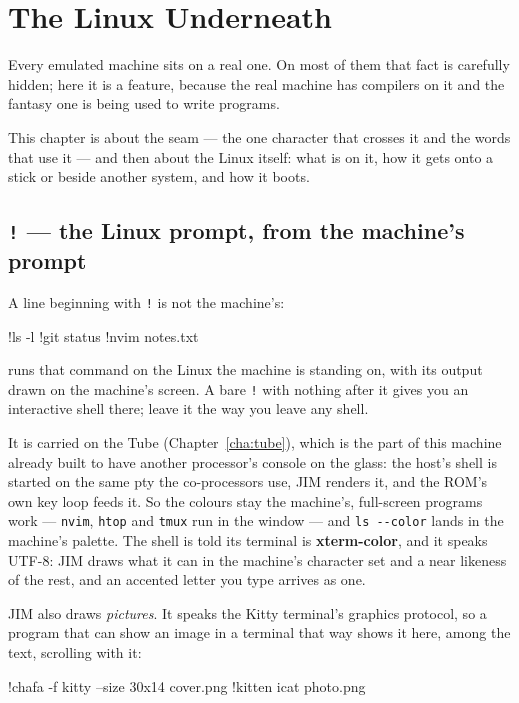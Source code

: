 \chapter{The Linux Underneath}\label{cha:linux}

Every emulated machine sits on a real one. On most of them that fact is
carefully hidden; here it is a feature, because the real machine has
compilers on it and the fantasy one is being used to write programs.

This chapter is about the seam --- the one character that crosses it and
the words that use it --- and then about the Linux itself: what is on
it, how it gets onto a stick or beside another system, and how it boots.

\section{\texttt{!} --- the Linux prompt, from the machine's prompt}
A line beginning with \verb|!| is not the machine's:

\begin{type}
!ls -l
!git status
!nvim notes.txt
\end{type}

\noindent runs that command on the Linux the machine is standing on, with
its output drawn on the machine's screen. A bare \verb|!| with nothing
after it gives you an interactive shell there; leave it the way you leave
any shell.

It is carried on the Tube (Chapter~\ref{cha:tube}), which is the part of
this machine already built to have another processor's console on the
glass: the host's shell is started on the same pty the co-processors use,
JIM renders it, and the ROM's own key loop feeds it. So the colours stay
the machine's, full-screen programs work --- \verb|nvim|, \verb|htop| and
\verb|tmux| run in the window --- and \verb|ls --color| lands in the
machine's palette. The shell is told its terminal is
\textbf{xterm-color}, and it speaks UTF-8: JIM draws what it can in the
machine's character set and a near likeness of the rest, and an accented
letter you type arrives as one.

JIM also draws \emph{pictures}. It speaks the Kitty terminal's graphics
protocol, so a program that can show an image in a terminal that way shows it
here, among the text, scrolling with it:

\begin{type}
!chafa -f kitty --size 30x14 cover.png
!kitten icat photo.png
\end{type}


